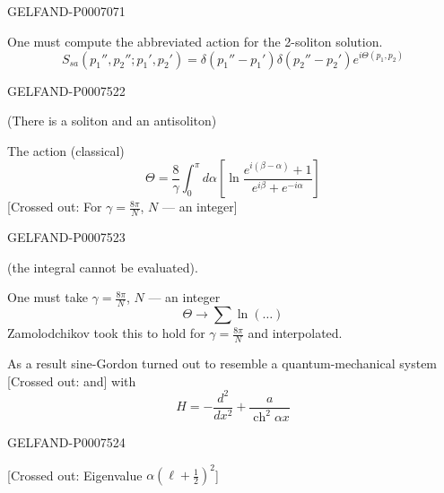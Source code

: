 \begin{GelfandAdjacentEvidence}{GELFAND-P000707}{1}


One must compute the abbreviated action for the 2-soliton solution.
\begin{equation*}
S_{sa}(p_1'',p_2'';p_1',p_2')
=\delta(p_1''-p_1')\delta(p_2''-p_2')e^{i\Theta(p_1,p_2)}
\tag{46}
\end{equation*}
\end{GelfandAdjacentEvidence}
\begin{GelfandAdjacentEvidence}{GELFAND-P000752}{2}

(There is a soliton and an antisoliton)

The action (classical)
\begin{equation*}
\Theta=\frac8\gamma\int_0^\pi d\alpha
\left[\ln\frac{e^{i(\beta-\alpha)}+1}{e^{i\beta}+e^{-i\alpha}}\right]
\tag{47}
\end{equation*}
[Crossed out: For \(\gamma=\frac{8\pi}{N}\), \(N\) --- an integer]
\end{GelfandAdjacentEvidence}
\begin{GelfandAdjacentEvidence}{GELFAND-P000752}{3}

(the integral cannot be evaluated).

One must take \(\gamma=\frac{8\pi}{N}\), \(N\) --- an integer
\begin{equation*}
\Theta\longrightarrow\sum\ln(\ldots)
\tag{48}
\end{equation*}
Zamolodchikov took this to hold for \(\gamma=\frac{8\pi}{N}\) and interpolated.

As a result sine-Gordon turned out to resemble a quantum-mechanical system [Crossed out: and] with
\begin{equation*}
H=-\frac{d^2}{dx^2}+\frac{a}{\operatorname{ch}^2\alpha x}
\tag{49}
\end{equation*}
\end{GelfandAdjacentEvidence}
\begin{GelfandAdjacentEvidence}{GELFAND-P000752}{4}

[Crossed out: Eigenvalue \(\alpha(\ell+\tfrac12)^2\)]
\end{GelfandAdjacentEvidence}
